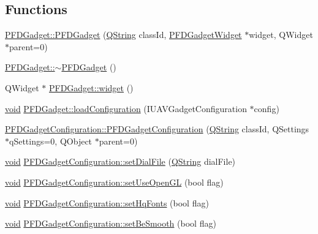 \subsection*{\-Functions}
\begin{DoxyCompactItemize}
\item 
\hyperlink{group___p_f_d_plugin_ga64f9ebd08e8c35c1b7b034f1e2ffe9bc}{\-P\-F\-D\-Gadget\-::\-P\-F\-D\-Gadget} (\hyperlink{group___u_a_v_objects_plugin_gab9d252f49c333c94a72f97ce3105a32d}{\-Q\-String} class\-Id, \hyperlink{class_p_f_d_gadget_widget}{\-P\-F\-D\-Gadget\-Widget} $\ast$widget, \-Q\-Widget $\ast$parent=0)
\item 
\hyperlink{group___p_f_d_plugin_ga8c86763f729f03d070b2fed80bbc36ea}{\-P\-F\-D\-Gadget\-::$\sim$\-P\-F\-D\-Gadget} ()
\item 
\-Q\-Widget $\ast$ \hyperlink{group___p_f_d_plugin_ga61807d4db8adc6952197c390f73bfcda}{\-P\-F\-D\-Gadget\-::widget} ()
\item 
\hyperlink{group___u_a_v_objects_plugin_ga444cf2ff3f0ecbe028adce838d373f5c}{void} \hyperlink{group___p_f_d_plugin_ga2789c1f4ec7af3eff76f4e84551d4fe5}{\-P\-F\-D\-Gadget\-::load\-Configuration} (\-I\-U\-A\-V\-Gadget\-Configuration $\ast$config)
\item 
\hyperlink{group___p_f_d_plugin_gacb5ca139ed284444e5e173641b6001bd}{\-P\-F\-D\-Gadget\-Configuration\-::\-P\-F\-D\-Gadget\-Configuration} (\hyperlink{group___u_a_v_objects_plugin_gab9d252f49c333c94a72f97ce3105a32d}{\-Q\-String} class\-Id, \-Q\-Settings $\ast$q\-Settings=0, \-Q\-Object $\ast$parent=0)
\item 
\hyperlink{group___u_a_v_objects_plugin_ga444cf2ff3f0ecbe028adce838d373f5c}{void} \hyperlink{group___p_f_d_plugin_gae14181eda65a05f6f8ad21aa6a531aaa}{\-P\-F\-D\-Gadget\-Configuration\-::set\-Dial\-File} (\hyperlink{group___u_a_v_objects_plugin_gab9d252f49c333c94a72f97ce3105a32d}{\-Q\-String} dial\-File)
\item 
\hyperlink{group___u_a_v_objects_plugin_ga444cf2ff3f0ecbe028adce838d373f5c}{void} \hyperlink{group___p_f_d_plugin_ga8a6a328024b4a742149d9922328a014b}{\-P\-F\-D\-Gadget\-Configuration\-::set\-Use\-Open\-G\-L} (bool flag)
\item 
\hyperlink{group___u_a_v_objects_plugin_ga444cf2ff3f0ecbe028adce838d373f5c}{void} \hyperlink{group___p_f_d_plugin_gaf36027ad5fc6d02f4433df45538cef4f}{\-P\-F\-D\-Gadget\-Configuration\-::set\-Hq\-Fonts} (bool flag)
\item 
\hyperlink{group___u_a_v_objects_plugin_ga444cf2ff3f0ecbe028adce838d373f5c}{void} \hyperlink{group___p_f_d_plugin_ga8a3abfa9447e111ebdfdddb6b005be4b}{\-P\-F\-D\-Gadget\-Configuration\-::set\-Be\-Smooth} (bool flag)

\end{DoxyCompactItemize}
